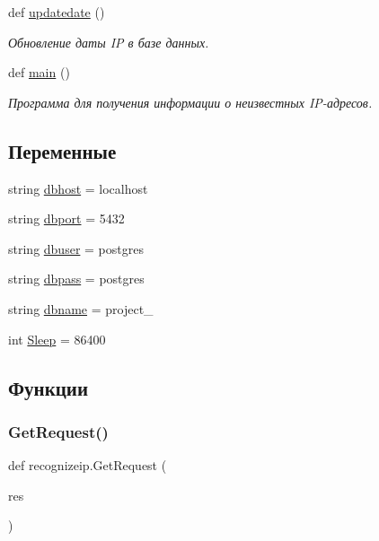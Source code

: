 \begin{DoxyCompactItemize}
def \hyperlink{namespacerecognizeip_af2c16760c67e840d48d82917a9c9cacb}{updatedate} ()
\begin{DoxyCompactList}\small\item\em Обновление даты IP в базе данных. \end{DoxyCompactList}\item 
def \hyperlink{namespacerecognizeip_aeacb92c088c1e5c9894254e390bc52c2}{main} ()
\begin{DoxyCompactList}\small\item\em Программа для получения информации о неизвестных I\+P-\/адресов. \end{DoxyCompactList}\end{DoxyCompactItemize}
\subsection*{Переменные}
\begin{DoxyCompactItemize}
\item 
string \hyperlink{namespacerecognizeip_ab088007f4af084f71c33ab23b8aa59fe}{dbhost} = \textquotesingle{}localhost\textquotesingle{}
\item 
string \hyperlink{namespacerecognizeip_ae2d5ad4fcc3fcd7393e4a18f53282798}{dbport} = \textquotesingle{}5432\textquotesingle{}
\item 
string \hyperlink{namespacerecognizeip_acc52b089af5fa13c73a78f70daa56494}{dbuser} = \textquotesingle{}postgres\textquotesingle{}
\item 
string \hyperlink{namespacerecognizeip_a4ed50ea7f07921938765ea73e8131467}{dbpass} = \textquotesingle{}postgres\textquotesingle{}
\item 
string \hyperlink{namespacerecognizeip_a114539cfda8487773400a49df2653b25}{dbname} = \textquotesingle{}project\+\_\textquotesingle{}
\item 
int \hyperlink{namespacerecognizeip_ad79dcdb5a4cb450c8945c8fe3185e85a}{Sleep} = 86400
\end{DoxyCompactItemize}


\subsection{Функции}
\mbox{\label{namespacerecognizeip_a362c41c14e0d237c722ab6c2234d6afa}} 
\subsubsection{\texorpdfstring{Get\+Request()}{GetRequest()}}
{\footnotesize\ttfamily def recognizeip.\+Get\+Request (\begin{DoxyParamCaption}\item[{}]{res }\end{DoxyParamCaption})}



